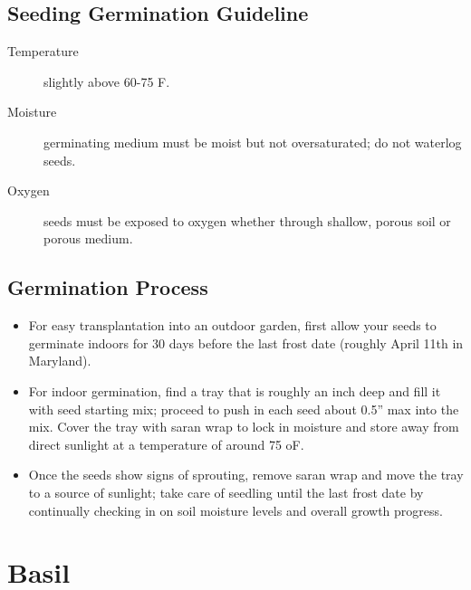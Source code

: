 \documentclass[12pt, oneside, a4paper]{memoir}
\begin{document}
    \section{Seeding Germination Guideline}
    \begin{description}
        \item[Temperature] slightly above 60-75 F.
        \item[Moisture] germinating medium must be moist but not oversaturated; do not waterlog seeds.
        \item[Oxygen] seeds must be exposed to oxygen whether through shallow, porous soil or porous medium.
    \end{description}    
    \section{Germination Process}
        \begin{itemize}
            \item For easy transplantation into an outdoor garden, first allow your seeds to germinate indoors for 30 days before
the last frost date (roughly April 11th in Maryland).
            \item For indoor germination, find a tray that is roughly an inch deep and fill it with seed starting mix; proceed to push
in each seed about 0.5” max into the mix. Cover the tray with saran wrap to lock in moisture and store away
from direct sunlight at a temperature of around 75
oF.
            \item Once the seeds show signs of sprouting, remove saran wrap and move the tray to a source of sunlight; take
care of seedling until the last frost date by continually checking in on soil moisture levels and overall growth
progress.
        \end{itemize}
\mainmatter
{}
\chapter{Basil}


    
\end{document}
